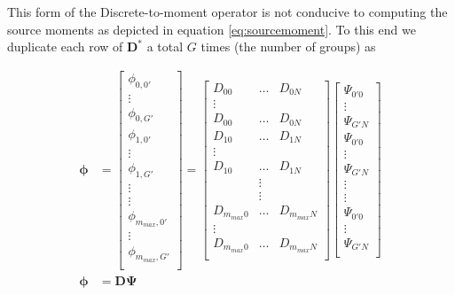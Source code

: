 \documentclass[11pt,letterpaper,titlepage]{article}
\numberwithin{equation}{section}
\begin{document}
This form of the Discrete-to-moment operator is not conducive to computing the source moments as depicted in equation \ref{eq:sourcemoment}. To this end we duplicate each row of $\mathbf{D}^*$ a total $G$ times (the number of groups) as

\begin{equation} \label{eq:phivector}
\begin{aligned}
\boldsymbol{\phi}&=
\begin{bmatrix}
\phi_{0,0'} \\ \vdots \\ \phi_{0,G'} \\
\phi_{1,0'} \\ \vdots \\ \phi_{1,G'} \\
\vdots \\ \vdots \\
\phi_{m_{max},0'} \\ \vdots \\ \phi_{m_{max},G'} \\
\end{bmatrix}
=
\begin{bmatrix}
D_{00} &\hdots &D_{0N} \\
\vdots \\
D_{00} &\hdots &D_{0N} \\
D_{10} &\hdots &D_{1N} \\
\vdots \\
D_{10} &\hdots &D_{1N} \\
& \vdots & \\ & \vdots & \\
D_{m_{max}0} &\hdots &D_{m_{max}N} \\
\vdots \\
D_{m_{max}0} &\hdots &D_{m_{max}N} \\
\end{bmatrix}
\begin{bmatrix}
\Psi_{0'0} \\
\vdots    \\
\Psi_{G'N} \\
\Psi_{0'0} \\
\vdots    \\
\Psi_{G'N} \\
\vdots \\ \vdots \\
\Psi_{0'0} \\
\vdots    \\
\Psi_{G'N} \\
\end{bmatrix} \\
\boldsymbol{\phi}&=\mathbf{D}\mathbf{\Psi}
\end{aligned}
\end{equation}
\end{document}
